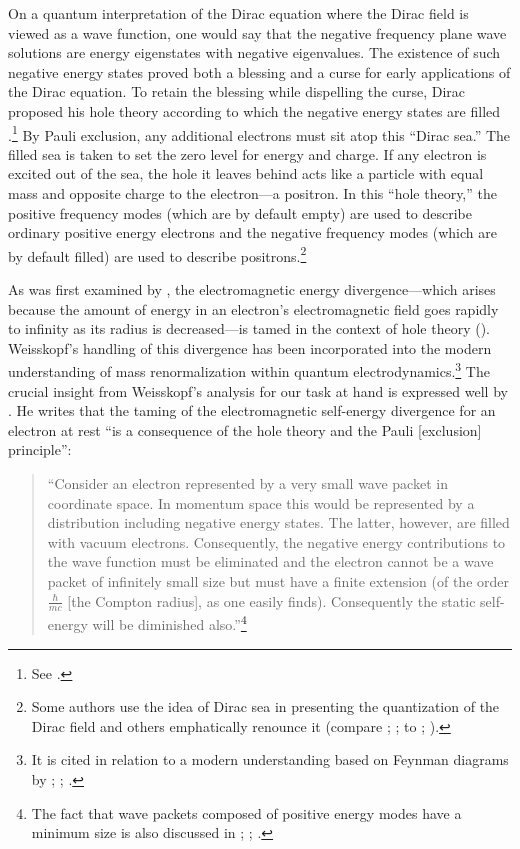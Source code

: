 \documentclass[12pt,secnumarabic,amsmath,amssymb,balancelastpage,nofootinbib]{article}
\begin{document}
On a quantum interpretation of the Dirac equation where the Dirac field is viewed as a wave function, one would say that the negative frequency plane wave solutions are energy eigenstates with negative eigenvalues.  The existence of such negative energy states proved both a blessing and a curse for early applications of the Dirac equation.  To retain the blessing while dispelling the curse, Dirac proposed his hole theory according to which the negative energy states are filled \citep{dirac1930theory}.\footnote{See \citet{saunders1991, pashby2012}.}  By Pauli exclusion, any additional electrons must sit atop this ``Dirac sea.''  The filled sea is taken to set the zero level for energy and charge.  If any electron is excited out of the sea, the hole it leaves behind acts like a particle with equal mass and opposite charge to the electron---a positron.  In this ``hole theory,'' the positive frequency modes (which are by default empty) are used to describe ordinary positive energy electrons and the negative frequency modes (which are by default filled) are used to describe positrons.\footnote{Some authors use the idea of Dirac sea in presenting the quantization of the Dirac field and others emphatically renounce it (compare \citealp[section 8a]{schweberQFT}; \citealp[section 13.4]{bjorkendrellfields}; \citealp{hatfield} to \citealp[chapter 2]{duncan}; \citealp[pg.\ 142]{schwartz}).}
 
As was first examined by \citet{weisskopf1934a, weisskopf1934b, weisskopf1939}, the electromagnetic energy divergence---which arises because the amount of energy in an electron's electromagnetic field goes rapidly to infinity as its radius is decreased---is tamed in the context of hole theory (\citealp[section 2.5.3]{schweber1994}).  Weisskopf's handling of this divergence has been incorporated into the modern understanding of mass renormalization within quantum electrodynamics.\footnote{It is cited in relation to a modern understanding based on Feynman diagrams by \citet[pg.\ 513]{schweberQFT}; \citet[pg.\ 165]{bjorkendrell}; \citet[section II.D.2]{weisskopf1986}.}  The crucial insight from Weisskopf's analysis for our task at hand is expressed well by \citet[pg.\ 299]{heitler}.  He writes that the taming of the electromagnetic self-energy divergence for an electron at rest ``is a consequence of the hole theory and the Pauli [exclusion] principle'':
\begin{quote}
``Consider an electron represented by a very small wave packet in coordinate space.  In momentum space this would be represented by a distribution including negative energy states.  The latter, however, are filled with vacuum electrons.  Consequently, the negative energy contributions to the wave function must be eliminated and the electron cannot be a wave packet of infinitely small size but must have a finite extension (of the order $\frac{\hbar}{mc}$ [the Compton radius], as one easily finds).  Consequently the static self-energy will be diminished also.''\footnote{The fact that wave packets composed of positive energy modes have a minimum size is also discussed in \citet{newton1949}; \citet[pg.\ 39]{bjorkendrell}; \citet{chuu2007}.}
\end{quote}
\end{document}

